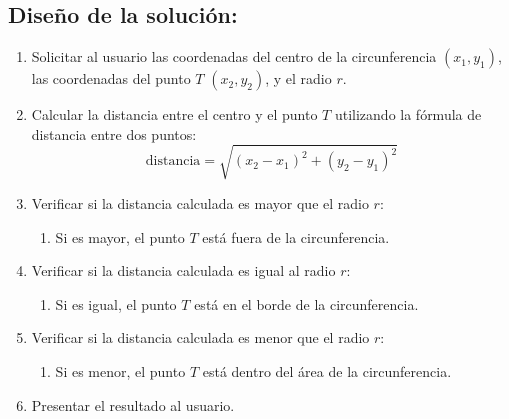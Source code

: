 \subsection{\textbf{Diseño de la solución:}}
\begin{enumerate} 
    \item Solicitar al usuario las coordenadas del centro de la circunferencia $(x_{1}, y_{1})$, las coordenadas del punto $T$ $(x_{2}, y_{2})$, y el radio $r$.
    
    \item Calcular la distancia entre el centro y el punto $T$ utilizando la fórmula de distancia entre dos puntos:
    \begin{equation}
        \text{distancia} = \sqrt{ (x_2 - x_1)^2 + (y_2 - y_1)^2 }
    \end{equation}

    \item Verificar si la distancia calculada es mayor que el radio $r$:
    \begin{enumerate}
        \item Si es mayor, el punto $T$ está fuera de la circunferencia.
    \end{enumerate}
    
    \item Verificar si la distancia calculada es igual al radio $r$:
    \begin{enumerate}
        \item Si es igual, el punto $T$ está en el borde de la circunferencia.
    \end{enumerate}

    \item Verificar si la distancia calculada es menor que el radio $r$:
    \begin{enumerate}
        \item Si es menor, el punto $T$ está dentro del área de la circunferencia.
    \end{enumerate}
    
    \item Presentar el resultado al usuario.
    
\end{enumerate}

